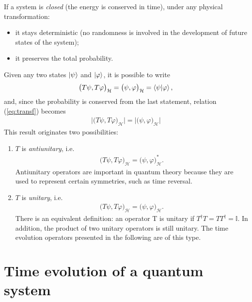 If a system is \textit{closed} (the energy is conserved in time), under any physical transformation: 
\begin{itemize}
    \item it stays deterministic (no randomness is involved in the development of future states of the system);
    \item it preserves the total probability.
\end{itemize}
Given any two states $\ket{\psi}$ and $\ket{\varphi}$, it is possible to write
\begin{align}
    \label{eq:transf}
    \big({T \psi}, {T \varphi} \big)_\mathcal{H} = \big({\psi}, {\varphi} \big)_\mathcal{H} = \braket{\psi}{\varphi},
\end{align}
and, since the probability is conserved from the last statement, relation (\ref{eq:transf}) becomes
\begin{align}
    \big|{\big({T \psi}, {T \varphi} \big)_\mathcal{H} } \big| = \big|{\big({\psi}, {\varphi} \big)_\mathcal{H}} \big|
\end{align}
This result originates two possibilities:
\begin{enumerate}
    \item $T$ is \textit{antiunitary}, i.e.
    \begin{align*}
        \big({T \psi}, {T \varphi} \big)_\mathcal{H} = \big( {\psi}, {\varphi} \big)_\mathcal{H}^*.
    \end{align*}
    Antiunitary operators are important in quantum theory because they are used to represent certain symmetries, such as time reversal.
    \item $T$ is \textit{unitary}, i.e.
    \begin{align*}
        \big({T \psi}, {T \varphi} \big)_\mathcal{H} = \big( {\psi}, {\varphi} \big)_\mathcal{H}.
    \end{align*}
   There is an equivalent definition: an operator T is unitary if $T^\dagger T = T T^\dagger = \mathbb{I}$. In addition, the product of two unitary operators is still unitary. The time evolution operators presented in the following are of this type. 
\end{enumerate}

\section{Time evolution of a quantum system}

